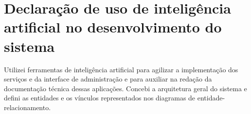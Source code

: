 \documentclass[tcc,capa]{texufpel}
\newif\ifemrevisao
\newcommand{\tintarevisao}{\ifemrevisao\color{correvisao}\fi}
\DeclareRobustCommand{\rev}[1]{{\tintarevisao #1}}
\begin{document}
\chapter{\rev{Declaração de uso de inteligência artificial no desenvolvimento do sistema}}\label{ap:ia-desenvolvimento}
\rev{Utilizei ferramentas de inteligência artificial para agilizar a implementação dos serviços e da interface de administração e para auxiliar na redação da documentação técnica dessas aplicações. Concebi a arquitetura geral do sistema e defini as entidades e os vínculos representados nos diagramas de entidade-relacionamento.}
\end{document}
